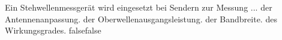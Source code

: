     {Ein Stehwellenmessgerät wird eingesetzt bei Sendern zur Messung ...}
    {der Antennenanpassung.}
    {der Oberwellenausgangsleistung.}
    {der Bandbreite.}
    {des Wirkungsgrades.}
    {false}{false}